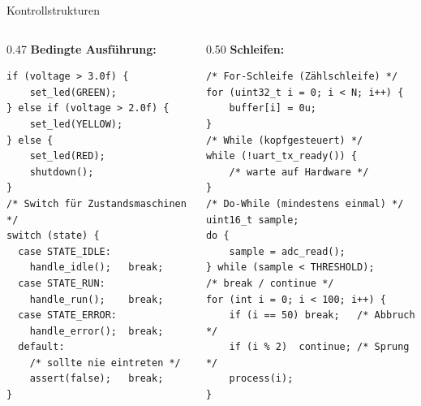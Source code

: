 \documentclass[%
  aspectratio=169,
  10pt
]{beamer}
\begin{document}
\begin{frame}[fragile]{Kontrollstrukturen}
  \begin{columns}[T]
    \begin{column}{0.47\textwidth}
      \textbf{Bedingte Ausführung:}
\begin{lstlisting}
if (voltage > 3.0f) {
    set_led(GREEN);
} else if (voltage > 2.0f) {
    set_led(YELLOW);
} else {
    set_led(RED);
    shutdown();
}
/* Switch für Zustandsmaschinen */
switch (state) {
  case STATE_IDLE:
    handle_idle();   break;
  case STATE_RUN:
    handle_run();    break;
  case STATE_ERROR:
    handle_error();  break;
  default:
    /* sollte nie eintreten */
    assert(false);   break;
}
\end{lstlisting}
    \end{column}
    \begin{column}{0.50\textwidth}
      \textbf{Schleifen:}
\begin{lstlisting}
/* For-Schleife (Zählschleife) */
for (uint32_t i = 0; i < N; i++) {
    buffer[i] = 0u;
}
/* While (kopfgesteuert) */
while (!uart_tx_ready()) {
    /* warte auf Hardware */
}
/* Do-While (mindestens einmal) */
uint16_t sample;
do {
    sample = adc_read();
} while (sample < THRESHOLD);
/* break / continue */
for (int i = 0; i < 100; i++) {
    if (i == 50) break;   /* Abbruch */
    if (i % 2)  continue; /* Sprung  */
    process(i);
}
\end{lstlisting}
    \end{column}
  \end{columns}
\end{frame}
\end{document}
